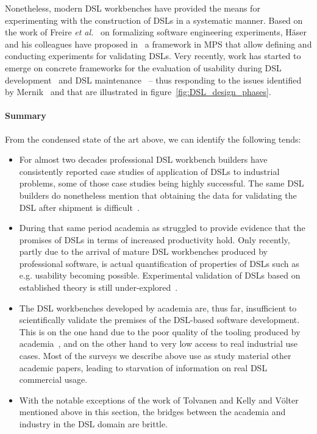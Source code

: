 \documentclass{scrartcl}
\begin{document}
Nonetheless, modern DSL workbenches have provided the means for experimenting
with the construction of DSLs in a systematic manner. Based on the work of
Freire \emph{et al.}~\cite{Freire14} on formalizing software engineering
experiments, H\"aser and his colleagues have proposed in~\cite{Haser16} a
framework in MPS that allow defining and conducting experiments for validating
DSLs. Very recently, work has started to emerge on concrete frameworks for the
evaluation of usability during DSL development~\cite{Barisic18} and DSL
maintenance~\cite{ThanhoferPilisch17} -- thus responding to the issues
identified by Mernik~\cite{Mernik17} and that are illustrated in
figure~\ref{fig:DSL_design_phases}.

\paragraph{Summary}
From the condensed state of the art above, we can identify the following tends:

\begin{itemize}
  \item For almost two decades professional DSL workbench builders have
  consistently reported case studies of application of DSLs to industrial
  problems, some of those case studies being highly successful.
  The same DSL builders do nonetheless mention that obtaining the data for
  validating the DSL after shipment is difficult~\cite{Tolvanen018}.
  \item During that same period academia as struggled to provide evidence that
  the promises of DSLs in terms of increased productivity hold. Only recently,
  partly due to the arrival of mature DSL workbenches produced by professional
  software, is actual quantification of properties of DSLs such as e.g.
  usability becoming possible. Experimental validation of DSLs based on
  established theory is still under-explored~\cite{Mernik17}.
  \item The DSL workbenches developed by academia are, thus far, insufficient to
  scientifically validate the premises of the DSL-based software development.
  This is on the one hand due to the poor quality of the tooling
  produced by academia~\cite{TolvanenKelly2016}, and on the other hand to very
  low access to real industrial use cases. Most of the surveys we describe above use as study
  material other academic papers, leading to starvation of information on real
  DSL commercial usage.
  \item With the notable exceptions of the work of Tolvanen and Kelly and
  Völter mentioned above in this section, the bridges between the academia and
  industry in the DSL domain are brittle.
\end{itemize}
\end{document}
